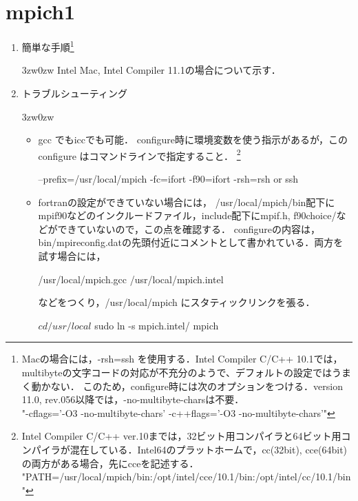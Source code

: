 
%
\section{mpich1}
\label{sec:mpich1}

\begin{enumerate}

\item 簡単な手順\footnote{Macの場合には，-rsh=ssh を使用する．Intel Compiler C/C++ 10.1では，multibyteの文字コードの対応が不充分のようで、デフォルトの設定ではうまく動かない．
このため，configure時には次のオプションをつける．version 11.0, rev.056以降では，-no-multibyte-charsは不要．\\
"-cflags='-O3 -no-multibyte-chars' -c++flags='-O3 -no-multibyte-chars'"
}

\begin{indentation}{3zw}{0zw}
Intel Mac, Intel Compiler 11.1の場合について示す．

{\small
{}
}
\end{indentation}
\vspace{3mm}

\item トラブルシューティング\\
\begin{indentation}{3zw}{0zw}

\begin{itemize}
\item gcc でもiccでも可能．
configure時に環境変数を使う指示があるが，このconfigure はコマンドラインで指定すること．
\footnote{Intel Compiler C/C++ ver.10までは，32ビット用コンパイラと64ビット用コンパイラが混在している．Intel64のプラットホームで，cc(32bit), cce(64bit) の両方がある場合，先にcceを記述する．\\
"PATH=/usr/local/mpich/bin:/opt/intel/cce/10.1/bin:/opt/intel/cc/10.1/bin"
}

{\small
\begin{program}
--prefix=/usr/local/mpich
-fc=ifort
-f90=ifort
-rsh=rsh or ssh
\end{program}
}
\vspace{3mm}

\item fortranの設定ができていない場合には， /usr/local/mpich/bin配下にmpif90などのインクルードファイル，include配下にmpif.h, f90choice/などができていないので，この点を確認する．
configureの内容は，bin/mpireconfig.datの先頭付近にコメントとして書かれている．両方を試す場合には，
{\small
\begin{program}
/usr/local/mpich.gcc
/usr/local/mpich.intel
\end{program}
}
などをつくり，/usr/local/mpich にスタティックリンクを張る．
{\small
\begin{program}
$ cd /usr/local
$ sudo ln -s mpich.intel/ mpich
\end{program}
}
\vspace{3mm}


\end{itemize}
\end{indentation}
\end{enumerate}
